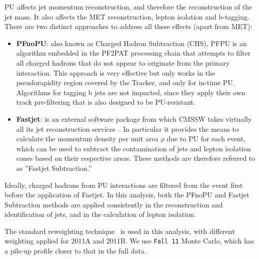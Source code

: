 PU affects jet momentum reconstruction, and therefore the reconstruction of the jet 
mass.  It also affects the MET reconstruction, 
lepton isolation and b-tagging.  There are two distinct approaches to address all these 
effects (apart from MET):
\begin{itemize}
 \item {\bf PFnoPU}: also known as Charged Hadron Subtraction (CHS), 
       PFPU is an algorithm embedded in the PF2PAT processing chain that attempts to 
       filter all charged hadrons that do not appear to originate from the primary 
       interaction.  This approach is very effective but only works in the pseudorapidity 
       region covered by the Tracker, and only for in-time PU.  Algorithms for tagging b 
       jets are not impacted, since they apply their own track pre-filtering that is also 
       designed to be PU-resistant.
 \item {\bf Fastjet}: is an external software package from which CMSSW takes virtually 
       all its jet reconstruction services~\cite{FastJet}.  In particular it provides the 
       means to calculate the momentum density per unit area $\rho$ due to PU for each 
       event, which can be used to subtract the contamination of jets and lepton isolation 
       cones based on their respective areas.  These methods are therefore referred 
       to as ''Fastjet Subtraction.'' 
\end{itemize}
Ideally, charged hadrons from PU interactions are filtered from the event first before
the application of Fastjet. In this analysis, both the PFnoPU and Fastjet Subtraction 
methods are applied consistently in the reconstruction and identification of jets,
and in the calculation of lepton isolation.

The standard reweighting technique~\cite{PUreweight} is used in this analysis, with
different weighting applied for 2011A and 2011B.  We use {\tt Fall 11} Monte Carlo, which
has a pile-up profile closer to that in the full data.


